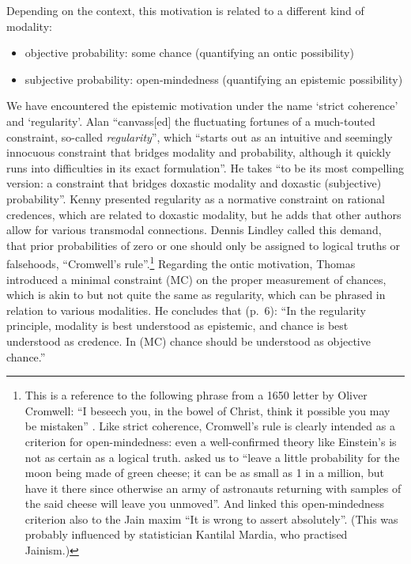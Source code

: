 Depending on the context, this motivation is related to a different kind of modality:
\begin{itemize}
  \item objective probability: some chance (quantifying an ontic possibility)
  \item subjective probability: open-mindedness (quantifying an epistemic possibility)
\end{itemize}
We have encountered the epistemic motivation under the name `strict coherence' and `regularity'.
Alan \citet[p.~1 of draft]{Hajek:2012b} ``canvass[ed] the fluctuating fortunes of a much-touted constraint, so-called \emph{regularity}'', which ``starts out as an intuitive and seemingly innocuous constraint that bridges modality and probability, although it quickly runs into difficulties in its exact formulation''. He takes ``to be its most compelling version: a constraint that bridges doxastic modality and doxastic (subjective) probability''.
Kenny \citet{Easwaran:2014} presented regularity as a normative constraint on rational credences, which are related to doxastic modality, but he adds that other authors allow for various transmodal connections.
Dennis Lindley called this demand, that prior probabilities of zero or one should only be assigned to logical truths or falsehoods, ``Cromwell's rule''.\footnote{This is a reference to the following phrase from a 1650 letter by Oliver Cromwell: ``I beseech you, in the bowel of Christ, think it possible you may be mistaken'' \citet[reprinted in][]{Carlyle:1845}. Like strict coherence, Cromwell's rule is clearly intended as a criterion for open-mindedness: even a well-confirmed theory like Einstein's is not as certain as a logical truth. \citet[p.~104]{Lindley:1991} asked us to ``leave a little probability for the moon being made of green cheese; it can be as small as 1 in a million, but have it there since otherwise an army of astronauts returning with samples of the said cheese will leave you unmoved''. And \citet[p.~91]{Lindley:2006} linked this open-mindedness criterion also to the Jain maxim ``It is wrong to assert absolutely''. (This was probably influenced by statistician Kantilal Mardia, who practised Jainism.)}
Regarding the ontic motivation, Thomas \citet{Hofweber:2014} introduced a minimal constraint (MC) on the proper measurement of chances, which is akin to but not quite the same as regularity, which can be phrased in relation to various modalities. He concludes that (p.~6): ``In the regularity principle, modality is best understood as epistemic, and chance is best understood as credence. In (MC) chance should be understood as objective chance.''

